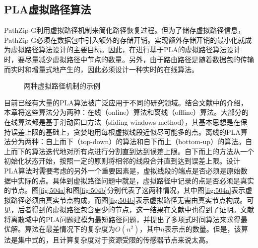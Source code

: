 \subsection{PLA虚拟路径算法}
PathZip-G利用虚拟路径机制来简化路径恢复过程。但为了储存虚拟路径信息，PathZip-G必须在数据包中引入额外的存储开销。实现额外存储开销的最小化就成为虚拟路径算法设计的主要目标。因此，在进行基于PLA的虚拟路径算法设计时，要尽量减少虚拟路径中节点的数量。另外，由于路由路径是随着数据包的传输而实时和增量式地产生的，因此必须设计一种实时的在线算法。
\begin{figure}[t]
  \centering
  \hspace{2em}
  \caption{两种虚拟路径机制的示例}
  \label{fig:504}
\end{figure}

目前已经有大量的PLA算法被广泛应用于不同的研究领域。结合文献中的介绍，本章将这些算法分为两种：在线（online）算法和离线（offline）算法。大部分的在线算法都是基于滑动窗口方法（sliding windows method），其基本思想是在保持误差上限的基础上，贪婪地用每根虚拟线段近似尽可能多的点。离线的PLA算法分为两种：自上而下（top-down）的算法和自下而上（bottom-up）的算法。自上而下的算法迭代地对所有点进行分割直到达到误差上限。自下而上的方法从一个初始化状态开始，按照一定的原则将相邻的线段合并直到达到误差上限。设计PLA算法时需要考虑的另外一个重要因素是，虚拟线段的端点是否必须是原始数据中实际的点。具体到虚拟路径问题中就是，虚拟路径中记录的点是否必须是真实的节点。图\ref{fig:504a}和图\ref{fig:504b}分别代表了这两种情况，其中图\ref{fig:504a}表示虚拟路径必须由真实节点构成，而图\ref{fig:504b}表示虚拟路径无需由真实节点构成。可见，后者得到的虚拟路径包含更少的节点，这一结果在文献中也得到了证明。文献将离散域中的PLA问题建模为最短路径问题，并提出了多项式时间算法来求得最优解。算法在最差情况下的复杂度为$O(n^2)$，其中$n$表示点的数量。但是，该算法是集中式的，且计算复杂度对于资源受限的传感器节点来说太高。

